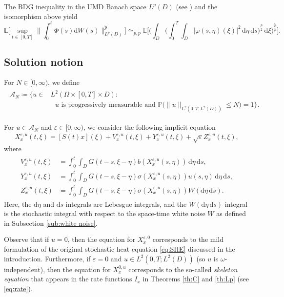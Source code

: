 \documentclass{amsart}
\theoremstyle{plain}
\theoremstyle{remark}
\theoremstyle{plain}
\numberwithin{equation}{section}
\newcommand{\ceqq}{\coloneqq}
\newcommand{\E}{{\mathbb E}}
\renewcommand{\P}{{\mathbb P}}
\newcommand{\eps}{\varepsilon}
\newcommand{\Om}{\Omega}
\newcommand{\om}{\omega}
\newcommand{\A}{{\mathcal A}}
\newcommand{\dd}{\,\mathrm{d}}
\newcommand{\ddd}{\mathrm{d}}
\begin{document}
The BDG inequality in the  UMD Banach space $L^p(D)$ (see \cite[(5.5)]{NVW15}) and the isomorphism above yield  
\begin{equation}\label{eq:BDG Lp}
 \E \Big[ \sup_{t \in [0,T]} \Big\| \int_0^t \Phi(s)\mathrm{d}W(s) \Big\|_{L^p(D)}^{\tilde p} \Big] \simeq_{p,\tilde p} \E\Big[ \Big(\int_D \Big( \int_0^T \int_D |\varphi(s, \eta)(\xi)|^2 \dd\eta \dd s \Big)^{\frac{p}{2}} \dd \xi\Big)^{\frac{\tilde p}{p}} \Big].
\end{equation} 
 

\subsection{Solution notion}

For $N\in[0,\infty)$, we define
\begin{align}\label{eq:AN}
\begin{split}
\A_N\ceqq \big\{u\in& L^2(\Om\times [0,T]\times D): \\
&\text{ $u$ is progressively measurable and } \P\big(\|u\|_{L^2(0,T;L^2(D))}\leq N\big)=1\big\}. 
\end{split}
\end{align}

For $u\in \A_N$ and $\eps\in[0,\infty)$, we consider the following implicit equation 
\begin{align}\label{eq:split X}
  X_x^{\eps,u}(t,\xi) = [S(t)x](\xi)+V^{\eps,u}_x(t,\xi)+Y_x^{\eps,u}(t,\xi)+\sqrt{\eps}Z_x^{\eps,u}(t,\xi),
\end{align}
where  
\begin{align}\label{eq:split Y Z}
\begin{split}
V^{\eps,u}_x(t,\xi) &=  
  \int_0^t \int_D G(t-s,\xi-\eta)b(X_x^{\eps,u}(s,\eta))\dd \eta\dd s, \\
  Y_x^{\eps,u}(t,\xi) &=  
  \int_0^t \int_D G(t-s,\xi-\eta)\sigma(X_x^{\eps,u}(s,\eta))u(s,\eta)\dd \eta\dd s, \\
  Z_x^{\eps,u}(t,\xi) &=   
  \int_0^t\int_D G(t-s,\xi-\eta)\sigma(X_x^{\eps,u}(s,\eta))W(\ddd\eta\dd s). \end{split}
\end{align}
Here, the $\ddd \eta$ and $\ddd s$ integrals are Lebesgue integrals, and the $W(\ddd\eta\dd s)$ integral is the stochastic integral with respect to the space-time white noise $W$ as defined in Subsection \ref{sub:white noise}. 

Observe that if $u=0$, then the equation for $X_x^{\eps,0}$ corresponds to the mild  formulation of the original stochastic heat equation \eqref{eq:SHE} discussed in the introduction. Furthermore, if $\eps=0$ and $u\in L^2(0,T;L^2(D))$ (so $u$ is $\om$-independent), then the equation for $X_x^{0,u}$ corresponds to  the so-called \emph{skeleton equation} that appears in the rate functions $I_x$ in Theorems \ref{th:C} and \ref{th:Lp} (see \eqref{eq:rate}). 
\end{document}
